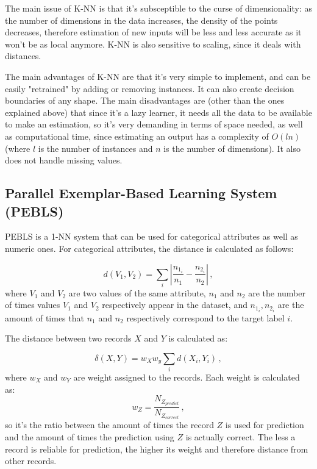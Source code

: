 The main issue of K-NN is that it's subsceptible to the curse of dimensionality: as the number of dimensions in the data increases, the density of the points decreases, therefore estimation of new inputs will be less and less accurate as it won't be as local anymore. K-NN is also sensitive to scaling, since it deals with distances.

The main advantages of K-NN are that it's very simple to implement, and can be easily "retrained" by adding or removing instances. It can also create decision boundaries of any shape. The main disadvantages are (other than the ones explained above) that since it's a lazy learner, it needs all the data to be available to make an estimation, so it's very demanding in terms of space needed, as well as computational time, since estimating an output has a complexity of $O(ln)$ (where $l$ is the number of instances and $n$ is the number of dimensions). It also does not handle missing values.

\subsection{Parallel Exemplar-Based Learning System (PEBLS)}

PEBLS is a 1-NN system that can be used for categorical attributes as well as numeric ones. For categorical attributes, the distance is calculated as follows:

\begin{equation*}
    d(V_1,V_2) = \sum_i | \dfrac{n_{1_i}}{n_1} - \dfrac{n_{2_i}}{n_2} | \, ,
\end{equation*}
where $V_1$ and $V_2$ are two values of the same attribute, $n_1$ and $n_2$ are the number of times values $V_1$ and $V_2$ respectively appear in the dataset, and $n_{1_i}, n_{2_i}$ are the amount of times that $n_1$ and $n_2$ respectively correspond to the target label $i$.

The distance between two records $X$ and $Y$ is calculated as:

\begin{equation*}
    \delta (X, Y) = w_X w_y \sum_i d(X_i, Y_i) \, ,
\end{equation*}
where $w_X$ and $w_Y$ are weight assigned to the records. Each weight is calculated as:
\begin{equation*}
    w_Z = \dfrac{N_{Z_{predict}}}{N_{Z_{correct}}} \, ,
\end{equation*}
so it's the ratio between the amount of times the record $Z$ is used for prediction and the amount of times the prediction using $Z$ is actually correct. The less a record is reliable for prediction, the higher its weight and therefore distance from other records.

